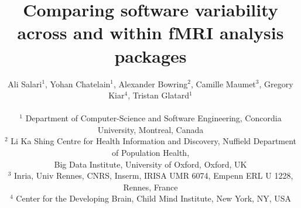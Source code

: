 \documentclass[11pt,onecolumn]{article}
\begin{document}
\newcommand{\fslspm}{FSL-SPM\xspace}
\newcommand{\fslafni}{FSL-AFNI\xspace}
\newcommand{\afnispm}{AFNI-SPM\xspace}
\newcommand{\tristan}[1]{\color{orange}\textbf{From Tristan:} #1\color{black}\xspace}
\newcommand{\camille}[1]{\color{blue}\textbf{From Camille:} #1\color{black}\xspace}
\newcommand{\ali}[2]{\color{green}\textbf{Ali:} #1\color{black}\xspace}
\newcommand{\discuss}[1]{\uwave{#1}}
\newcommand{\gk}[1]{\color{purple}#1 \textbf{-GK}\color{black}\xspace}
\newcommand{\yohan}[1]{\color{cyan!75!black} \textbf{Yohan:} #1\color{black}\xspace}
\newcommand{\yohanmod}[1]{\color{cyan!75!black} \sout{#1}\color{black}\xspace}


\title{Comparing software variability across and within fMRI analysis packages}

\author{Ali Salari$^1$, Yohan Chatelain$^1$, Alexander Bowring$^2$, Camille Maumet$^3$, Gregory Kiar$^4$, Tristan Glatard$^1$\\
  \vspace*{0.1cm}\\
  $^1$ Department of Computer-Science and Software Engineering, Concordia University, Montreal, Canada\\
  $^2$ Li Ka Shing Centre for Health Information and Discovery, Nuffield Department of Population Health,\\ Big Data Institute, University of Oxford, Oxford, UK\\
  $^3$ Inria, Univ Rennes, CNRS, Inserm, IRISA UMR 6074, Empenn ERL U 1228, Rennes, France\\
  $^4$ Center for the Developing Brain, Child Mind Institute, New York, NY, USA}
\end{document}
